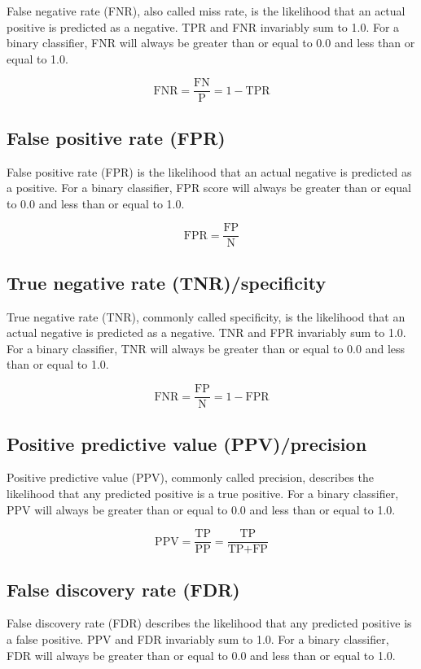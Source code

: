 \documentclass[letterpaper, 12pt]{article}
\begin{document}
False negative rate (FNR), also called miss rate, is the likelihood that an actual positive is predicted as a negative. TPR and FNR invariably sum to 1.0. For a binary classifier, FNR will always be greater than or equal to 0.0 and less than or equal to 1.0.

$$\textrm{FNR} = \frac{\textrm{FN}}{\textrm{P}} = 1 - \textrm{TPR}$$

\subsection*{False positive rate (FPR)}

False positive rate (FPR) is the likelihood that an actual negative is predicted as a positive. For a binary classifier, FPR score will always be greater than or equal to 0.0 and less than or equal to 1.0.

$$\textrm{FPR} = \frac{\textrm{FP}}{\textrm{N}}$$

\subsection*{True negative rate (TNR)/specificity}

True negative rate (TNR), commonly called specificity, is the likelihood that an actual negative is predicted as a negative. TNR and FPR invariably sum to 1.0. For a binary classifier, TNR will always be greater than or equal to 0.0 and less than or equal to 1.0.

$$\textrm{FNR} = \frac{\textrm{FP}}{\textrm{N}} = 1 - \textrm{FPR}$$

\subsection*{Positive predictive value (PPV)/precision}

Positive predictive value (PPV), commonly called precision, describes the likelihood that any predicted positive is a true positive. For a binary classifier, PPV will always be greater than or equal to 0.0 and less than or equal to 1.0.

$$\textrm{PPV} = \frac{\textrm{TP}}{\textrm{PP}} = \frac{\textrm{TP}}{\textrm{TP} + \textrm{FP}}$$

\subsection*{False discovery rate (FDR)}

False discovery rate (FDR) describes the likelihood that any predicted positive is a false positive. PPV and FDR invariably sum to 1.0. For a binary classifier, FDR will always be greater than or equal to 0.0 and less than or equal to 1.0.
\end{document}
